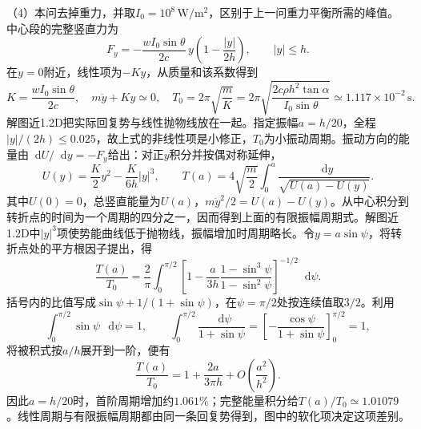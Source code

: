 \documentclass[UTF8,fontset=fandol,a4paper,11pt]{ctexart}
\newcommand{\dd}{\mathop{}\!\mathrm{d}}
\begin{document}
（4）本问去掉重力，并取$I_0=10^8\,\mathrm{W/m^2}$，区别于上一问重力平衡所需的峰值。中心段的完整竖直力为
\[
 F_y=-\frac{wI_0\sin\theta}{2c}\,y
 \left(1-\frac{|y|}{2h}\right),\qquad |y|\le h.
\]
在$y=0$附近，线性项为$-Ky$，从质量和该系数得到
\[
K=\frac{wI_0\sin\theta}{2c},\quad
m\ddot y+Ky\simeq0,\quad
\boxed{T_0=2\pi\sqrt{\frac mK}
=2\pi\sqrt{\frac{2c\rho h^2\tan\alpha}{I_0\sin\theta}}
\simeq1.117\times10^{-2}\,\mathrm s}.
\]
解图近1.2D把实际回复势与线性抛物线放在一起。指定振幅$a=h/20$，全程$|y|/(2h)\le0.025$，故上式的非线性项是小修正，$T_0$为小振动周期。振动方向的能量由$\dd U/\dd y=-F_y$给出：对正$y$积分并按偶对称延伸，
\[
U(y)=\frac K2y^2-\frac{K}{6h}|y|^3,\qquad
T(a)=4\sqrt{\frac m2}\int_0^a\frac{\dd y}{\sqrt{U(a)-U(y)}}.
\]
其中$U(0)=0$，总竖直能量为$U(a)$，$m\dot y^2/2=U(a)-U(y)$。从中心积分到转折点的时间为一个周期的四分之一，因而得到上面的有限振幅周期式。解图近1.2D中$|y|^3$项使势能曲线低于抛物线，振幅增加时周期略长。令$y=a\sin\psi$，将转折点处的平方根因子提出，得
\[
 \frac{T(a)}{T_0}=\frac2\pi\int_0^{\pi/2}
 \left[1-\frac{a}{3h}\frac{1-\sin^3\psi}{1-\sin^2\psi}\right]^{-1/2}\dd\psi.
\]
括号内的比值写成$\sin\psi+1/(1+\sin\psi)$，在$\psi=\pi/2$处按连续值取$3/2$。利用
\[
 \int_0^{\pi/2}\sin\psi\,\dd\psi=1,\qquad
 \int_0^{\pi/2}\frac{\dd\psi}{1+\sin\psi}
 =\left[-\frac{\cos\psi}{1+\sin\psi}\right]_0^{\pi/2}=1,
\]
将被积式按$a/h$展开到一阶，便有
\[
 \frac{T(a)}{T_0}=1+\frac{2a}{3\pi h}
 +O\!\left(\frac{a^2}{h^2}\right).
\]
因此$a=h/20$时，首阶周期增加约$1.061\%$；完整能量积分给$T(a)/T_0\simeq1.01079$。线性周期与有限振幅周期都由同一条回复势得到，图中的软化项决定这项差别。
\end{document}
